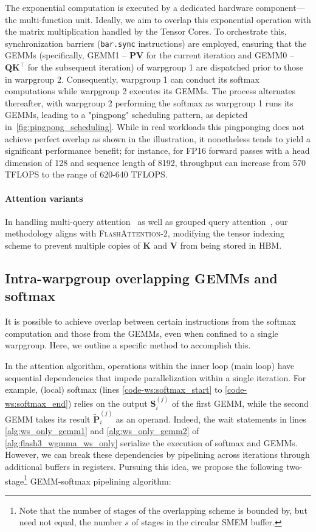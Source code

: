 \begin{enumerate}
The exponential computation is executed by a dedicated hardware component—the multi-function unit. Ideally, we aim to overlap this exponential operation with the matrix multiplication handled by the Tensor Cores. To orchestrate this, synchronization barriers (\texttt{bar.sync} instructions) are employed, ensuring that the GEMMs (specifically, GEMM1 -- $\mathbf{P} \mathbf{V}$ for the current iteration and GEMM0 -- $\mathbf{Q} \mathbf{K}^\top$ for the subsequent iteration) of warpgroup 1 are dispatched prior to those in warpgroup 2. Consequently, warpgroup 1 can conduct its softmax computations while warpgroup 2 executes its GEMMs. The process alternates thereafter, with warpgroup 2 performing the softmax as warpgroup 1 runs its GEMMs, leading to a "pingpong" scheduling pattern, as depicted in~\cref{fig:pingpong_scheduling}. While in real workloads this pingponging does not achieve perfect overlap as shown in the illustration, it nonetheless tends to yield a significant performance benefit; for instance, for FP16 forward passes with a head dimension of 128 and sequence length of 8192, throughput can increase from 570 TFLOPS to the range of 620-640 TFLOPS.

\paragraph{Attention variants} In handling multi-query attention~\citep{shazeer2019fast} as well as grouped query attention~\citep{ainslie2023gqa}, our methodology aligns with \textsc{FlashAttention-2}, modifying the tensor indexing scheme to prevent multiple copies of $\mathbf{K}$ and $\mathbf{V}$ from being stored in HBM.

\subsection{Intra-warpgroup overlapping GEMMs and softmax}

It is possible to achieve overlap between certain instructions from the softmax computation and those from the GEMMs, even when confined to a single warpgroup. Here, we outline a specific method to accomplish this.

In the attention algorithm, operations within the inner loop (main loop) have sequential dependencies that impede parallelization within a single iteration. For example, (local) softmax (lines \ref{code-ws:softmax_start} to \ref{code-ws:softmax_end}) relies on the output $\mathbf{S}_i^{(j)}$ of the first GEMM, while the second GEMM takes its result $\widetilde{\mathbf{P}}_i^{(j)}$ as an operand. Indeed, the wait statements in lines \ref{alg:ws_only_gemm1} and \ref{alg:ws_only_gemm2} of \cref{alg:flash3_wgmma_ws_only} serialize the execution of softmax and GEMMs. However, we can break these dependencies by pipelining across iterations through additional buffers in registers. Pursuing this idea, we propose the following two-stage\footnote{Note that the number of stages of the overlapping scheme is bounded by, but need not equal, the number $s$ of stages in the circular SMEM buffer.} GEMM-softmax pipelining algorithm:


\end{enumerate}

